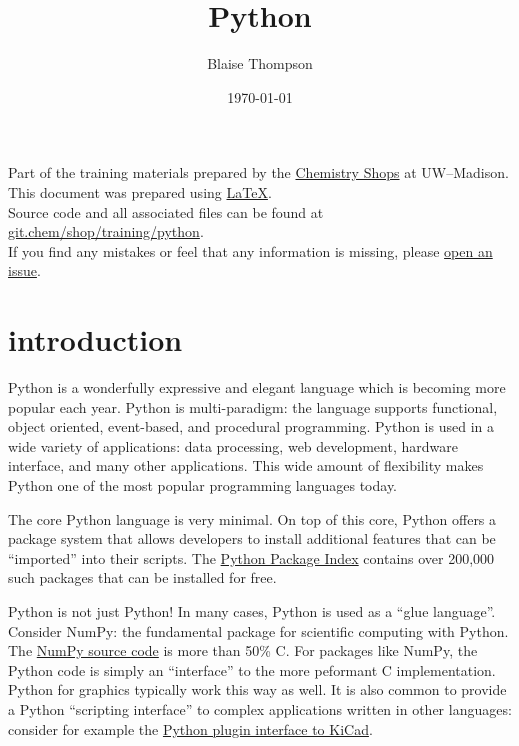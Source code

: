 \documentclass{training}
\title{Python}
\date{\today}
\author{Blaise Thompson}
\begin{document}
\maketitle
\renewcommand{\baselinestretch}{0.5}\normalsize
\tableofcontents
\renewcommand{\baselinestretch}{1.0}\normalsize
\vfill

Part of the training materials prepared by the \href{https://shops.chem.wisc.edu/}{Chemistry Shops} at UW--Madison. \\
This document was prepared using \href{https://www.latex-project.org/}{\LaTeX}. \\
Source code and all associated files can be found at \href{https://git.chem.wisc.edu/shop/training/python}{git.chem/shop/training/python}. \\
If you find any mistakes or feel that any information is missing, please \href{https://git.chem.wisc.edu/shop/training/python/issues}{open an issue}. \\

\clearpage
\section{introduction}

Python is a wonderfully expressive and elegant language which is becoming more popular each year.
Python is multi-paradigm: the language supports functional, object oriented, event-based, and procedural programming.
Python is used in a wide variety of applications: data processing, web development, hardware interface, and many other applications.
This wide amount of flexibility makes Python one of the most popular programming languages today.

The core Python language is very minimal.
On top of this core, Python offers a package system that allows developers to install additional features that can be ``imported'' into their scripts.
The \href{https://pypi.org/}{Python Package Index} contains over 200,000 such packages that can be installed for free.

Python is not just Python!
In many cases, Python is used as a ``glue language''.
Consider NumPy: the fundamental package for scientific computing with Python.
The \href{https://github.com/numpy/numpy}{NumPy source code} is more than 50\% C.
For packages like NumPy, the Python code is simply an ``interface'' to the more peformant C implementation.
Python for graphics typically work this way as well.
It is also common to provide a Python ``scripting interface'' to complex applications written in other languages: consider for example the \href{https://docs.kicad-pcb.org/doxygen/md_Documentation_development_pcbnew-plugins.html}{Python plugin interface to KiCad}.
\end{document}
